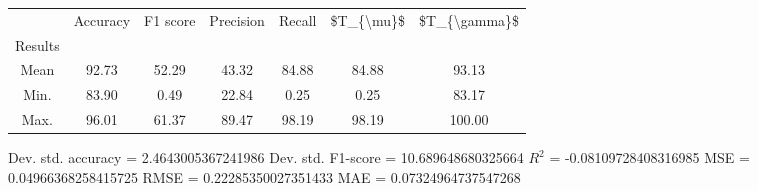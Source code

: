 \begin{tabular}{|c|c|c|c|c|c|c|}
\toprule
{} &  Accuracy &  F1 score &  Precision &  Recall &  \$T\_\{\textbackslash mu\}\$ &  \$T\_\{\textbackslash gamma\}\$ \\
Results &           &           &            &         &            &               \\
\hline
Mean    &     92.73 &     52.29 &      43.32 &   84.88 &      84.88 &         93.13 \\
Min.    &     83.90 &      0.49 &      22.84 &    0.25 &       0.25 &         83.17 \\
Max.    &     96.01 &     61.37 &      89.47 &   98.19 &      98.19 &        100.00 \\
\bottomrule
\end{tabular}

 Dev. std. accuracy = 2.4643005367241986
 Dev. std. F1-score = 10.689648680325664
 $R^2$ = -0.08109728408316985
 MSE = 0.04966368258415725
 RMSE = 0.22285350027351433
 MAE = 0.07324964737547268
